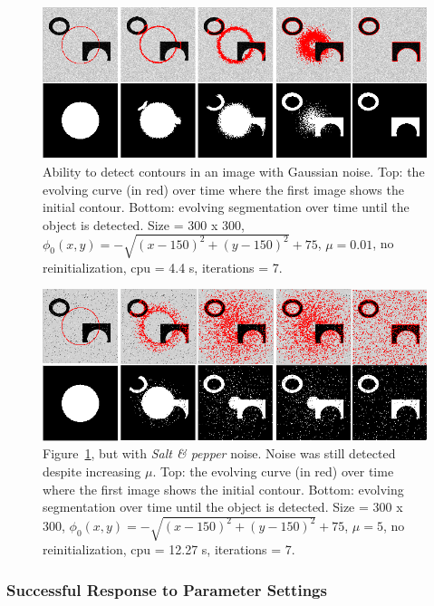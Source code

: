 \documentclass[10pt,twocolumn,letterpaper]{article}
\begin{document}
\begin{figure}[t]
\centering
\includegraphics[width=12cm]{cv_eg10.png}
\caption{Ability to detect contours in an image with Gaussian noise.  Top: the evolving curve (in red) over time where the first
image shows the initial
contour. Bottom: evolving segmentation over time until the object is detected. Size = 300 x 300, $\phi_{0}(x,y) = - \sqrt{(x - 150)^2 + (y - 150)^2} +
75$, $\mu =0.01$, no reinitialization, cpu = 4.4 s, iterations = 7.}
\label{fig:cv_eg10}
\end{figure}

\begin{figure}[t!]
\centering
\includegraphics[width=12cm]{cv_eg11.png}
\caption{Figure~\ref{fig:cv_eg10}, but with \textit{Salt \& pepper} noise. Noise was still detected despite increasing $\mu$.  Top: the evolving
curve
(in red) over time where the first
image shows the initial
contour. Bottom: evolving segmentation over time until the object is detected. Size = 300 x 300, $\phi_{0}(x,y) = - \sqrt{(x - 150)^2 + (y - 150)^2} +
75$, $\mu = 5$, no reinitialization, cpu = 12.27 s, iterations = 7.}
\label{fig:cv_eg11}
\end{figure}

\subsubsection*{Successful Response to Parameter Settings}
\end{document}
